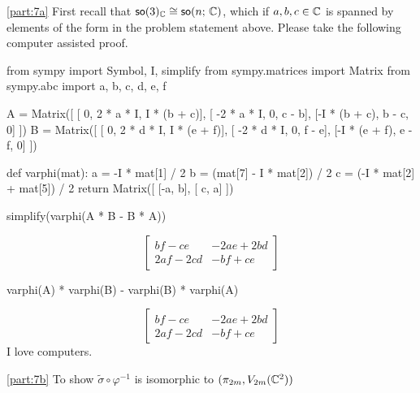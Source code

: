\documentclass[
	pages,
	boxes,
	color=WildStrawberry
]{homework}
\begin{document}
\begin{solution}
	\ref{part:7a}
	First recall that $\mathsf{so}(3)_{\mathbb{C}}\cong \mathsf{so}(n;\,\mathbb{C})$, which if $a, b, c\in\mathbb{C}$ is spanned by elements of the form in the problem statement above. Please take the following computer assisted proof.
	\begin{python}
from sympy import Symbol, I, simplify
from sympy.matrices import Matrix
from sympy.abc import a, b, c, d, e, f

A = Matrix([
    [           0, 2 * a * I, I * (b + c)],
    [  -2 * a * I,         0,       c - b],
    [-I * (b + c),     b - c,           0]
])
B = Matrix([
    [           0, 2 * d * I, I * (e + f)],
    [  -2 * d * I,         0,       f - e],
    [-I * (e + f),     e - f,           0]
])

def varphi(mat):
    a = -I * mat[1] / 2
    b = (mat[7] - I * mat[2]) / 2
    c = (-I * mat[2] + mat[5]) / 2
    return Matrix([
        [-a, b],
        [ c, a]
    ])

simplify(varphi(A * B - B * A))\end{python}
	\begin{equation*}
		\left[\begin{matrix}b f - c e & - 2 a e + 2 b d\\2 a f - 2 c d & - b f + c e\end{matrix}\right]
	\end{equation*}
	\begin{python}
varphi(A) * varphi(B) - varphi(B) * varphi(A)\end{python}
	\begin{equation*}
		\left[\begin{matrix}b f - c e & - 2 a e + 2 b d\\2 a f - 2 c d & - b f + c e\end{matrix}\right]
	\end{equation*}
	I love computers.

	\ref{part:7b}
	To show $\tilde{\sigma}\circ\varphi^{-1}$ is isomorphic to $(\pi_{2m}, V_{2m}(\mathbb{C}^2))$



\end{solution}
\end{document}
